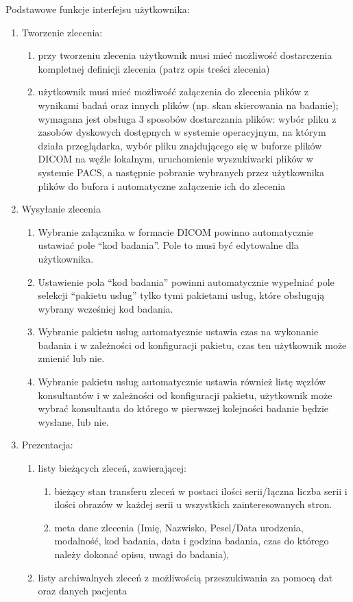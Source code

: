 \documentclass[a4paper]{report}
\begin{document}
Podstawowe funkcje interfejsu użytkownika:
\begin{enumerate}
  \item Tworzenie zlecenia:
      \begin{enumerate}
      \item przy tworzeniu zlecenia użytkownik musi mieć możliwość dostarczenia kompletnej definicji zlecenia (patrz opis treści zlecenia)
      \item użytkownik musi mieć możliwość załączenia do zlecenia plików z wynikami badań oraz innych plików (np. skan  skierowania na badanie); wymagana jest obsługa 3 sposobów dostarczania plików: wybór pliku z zasobów dyskowych dostępnych w systemie operacyjnym, na którym działa przeglądarka, wybór pliku znajdującego się w buforze plików DICOM na węźle lokalnym, uruchomienie wyszukiwarki plików w systemie PACS, a następnie pobranie wybranych przez użytkownika plików do bufora i automatyczne załączenie ich do zlecenia
      \end{enumerate}
  \item Wysyłanie zlecenia
      \begin{enumerate}
      \item Wybranie załącznika w formacie DICOM powinno automatycznie ustawiać pole "`kod badania"'. Pole to musi być edytowalne dla użytkownika.
      \item Ustawienie pola "`kod badania"' powinni automatycznie wypełniać pole selekcji "`pakietu usług"' tylko tymi pakietami usług, które obsługują wybrany wcześniej kod badania.
      \item Wybranie pakietu usług automatycznie ustawia czas na wykonanie badania i w zależności od konfiguracji pakietu, czas ten użytkownik może zmienić lub nie.
      \item Wybranie pakietu usług automatycznie ustawia również listę węzłów konsultantów i w zależności od konfiguracji pakietu, użytkownik może wybrać konsultanta do którego w pierwszej kolejności badanie będzie wysłane, lub nie.
      \end{enumerate}
  \item Prezentacja:
    \begin{enumerate}
      \item listy bieżących zleceń, zawierającej:
	  \begin{enumerate}
	  \item bieżący stan transferu zleceń w postaci ilości serii/łączna liczba serii i ilości obrazów w każdej serii u wszystkich zainteresowanych stron.
	  \item meta dane zlecenia (Imię, Nazwisko, Pesel/Data urodzenia, modalność, kod badania, data i godzina badania, czas do którego należy dokonać opisu, uwagi do badania),
	  \end{enumerate}
      \item listy archiwalnych zleceń z możliwością przeszukiwania za pomocą dat oraz danych pacjenta
    \end{enumerate}

\end{enumerate}
\end{document}
